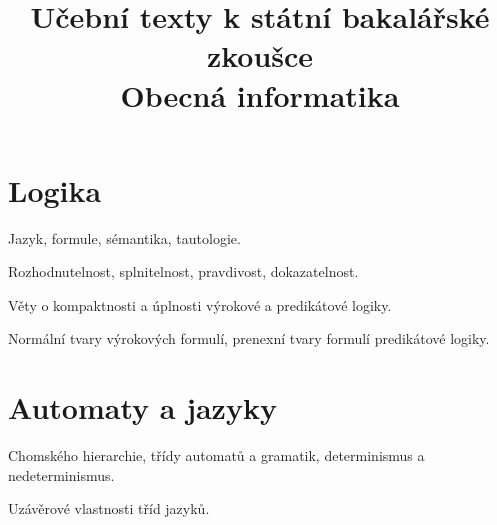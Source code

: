 \clearpage

\clearpage

\title{\LARGE Učební texty k státní bakalářské zkoušce \\ Obecná informatika}




\maketitle

\clearpage

\clearpage

\tableofcontents

\newpage

\section{Logika}
\begin{pozadavky}
\begin{pitemize}
\item Jazyk, formule, sémantika, tautologie.
\item Rozhodnutelnost, splnitelnost, pravdivost, dokazatelnost.
\item Věty o kompaktnosti a úplnosti výrokové a predikátové logiky.
\item Normální tvary výrokových formulí, prenexní tvary formulí predikátové logiky.
\end{pitemize}
\end{pozadavky}





\section{Automaty a jazyky}
\begin{pozadavky}
\begin{pitemize}
\item Chomského hierarchie, třídy automatů a gramatik, determinismus a nedeterminismus.
\item Uzávěrové vlastnosti tříd jazyků.
\end{pitemize}
\end{pozadavky}



